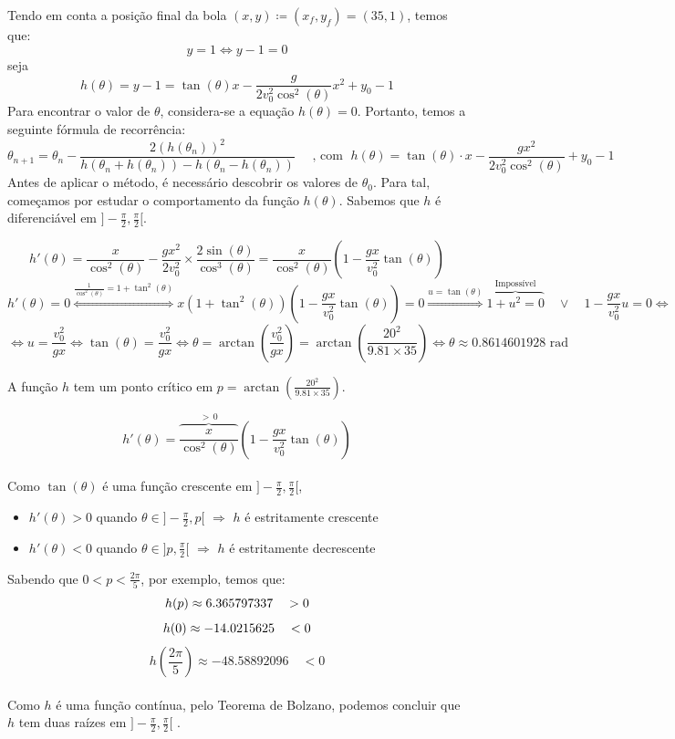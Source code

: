 \documentclass[12pt,a4paper]{article}
\begin{document}
    \noindent Tendo em conta a posição final da bola $(x,y) \coloneqq (x_f,y_f)=(35,1)$, temos que:
    \[
        y=1 \Leftrightarrow y-1=0
    \]
    seja \[h(\theta)=y-1=\tan(\theta)x - \frac{g}{2v_0^2\cos^2(\theta)}x^2+y_0-1\]
    Para encontrar o valor de $\theta$, considera-se a equação $h(\theta)=0$. Portanto, temos a seguinte fórmula de recorrência:
    \[
        \theta_{n+1}=\theta_n-\frac{2(h(\theta_n))^2}{h(\theta_n+h(\theta_n))-h(\theta_n-h(\theta_n))} \quad \text{ , com } \;  h(\theta)=\tan(\theta) \cdot x - \frac{gx^2}{2v_0^2\cos^2(\theta)}+y_0-1
    \]
    Antes de aplicar o método, é necessário descobrir os valores de $\theta_0$. Para tal, começamos por estudar o comportamento da função $h(\theta)$. Sabemos que $h$ é diferenciável em $]-\frac{\pi}{2},\frac{\pi}{2}[$.

    \[
        h'(\theta)=\frac{x}{\cos^2(\theta)}-\frac{gx^2}{2v_0^2}\times\frac{2\sin(\theta)}{\cos^3(\theta)}=\frac{x}{\cos^2(\theta)}\left(1-\frac{gx}{v_0^2}\tan(\theta)\right)
    \]    
\[
    h'(\theta)=0 
    \overset{\frac{1}{\cos^2(\theta)}=1+\tan^2(\theta)}{\Leftrightarrow} x(1+\tan^2(\theta))\left(1-\frac{gx}{v_0^2}\tan(\theta)\right)=0 
    \overset{u=\tan(\theta)}{\Rightarrow} \overbrace{1+u^2=0}^{\text{Impossível}} \quad \vee \quad 1-\frac{gx}{v_0^2}u=0\Leftrightarrow
\]
\[
    \Leftrightarrow u=\frac{v_0^2}{gx}\Leftrightarrow \tan(\theta)=\frac{v_0^2}{gx}\Leftrightarrow \theta=\arctan\left(\frac{v_0^2}{gx}\right)=\arctan\left(\frac{20^2}{9.81\times35}\right)\Leftrightarrow\theta\approx0.8614601928\text{ rad}
\]

A função $h$ tem um ponto crítico em $p=\arctan\left(\frac{20^2}{9.81\times35}\right)$.

\[
     h'(\theta)=\overbrace{\frac{x}{\cos^2(\theta)}}^{>\,0}\left(1-\frac{gx}{v_0^2}\tan(\theta)\right)
\]
\\
Como \(\tan(\theta)\) é uma função crescente em $]-\frac{\pi}{2},\frac{\pi}{2}[$,
\begin{itemize}
    \item $h'(\theta)>0$ quando $\theta \in ]-\frac{\pi}{2},p[$ $\Rightarrow$ $h$ é estritamente crescente
    \item $h'(\theta)<0$ quando $\theta \in ]p,\frac{\pi}{2}[$ $\Rightarrow$ $h$ é estritamente decrescente
\end{itemize}

    Sabendo que $0<p<\frac{2\pi}{5}$, por exemplo, temos que:
    \[
    h(p)\approx 6.365797337 \quad >0\\
    \]\[
    h(0)\approx -14.0215625 \quad <0\\
    \]\[
    h\left(\frac{2\pi}{5}\right)\approx-48.58892096 \quad <0
    \]\\
\noindent Como $h$ é uma função contínua, pelo Teorema de Bolzano, podemos concluir que $h$ tem duas raízes em $]-\frac{\pi}{2},\frac{\pi}{2}[$ .\\[10pt]
\end{document}
